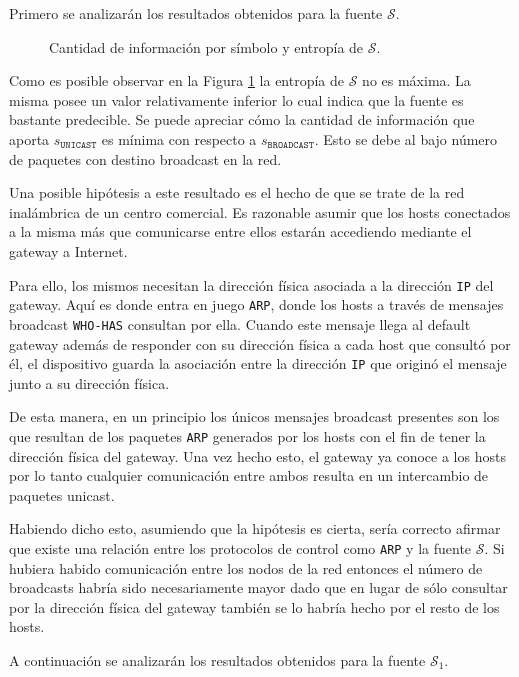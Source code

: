 Primero se analizarán los resultados obtenidos para la fuente $\mathcal{S}$.

\begin{figure}[h]
	\caption{Cantidad de información por símbolo y entropía de $\mathcal{S}$.}
    \label{res:esc2:fig1}
\end{figure}


Como es posible observar en la Figura \ref{res:esc2:fig1} la entropía de
$\mathcal{S}$ no es máxima. La misma posee un valor relativamente inferior lo
cual indica que la fuente es bastante predecible. Se puede apreciar cómo la
cantidad de información que aporta $s_{\texttt{UNICAST}}$ es mínima con respecto
a $s_{\texttt{BROADCAST}}$. Esto se debe al bajo número de paquetes con destino
broadcast en la red.

Una posible hipótesis a este resultado es el hecho de que se trate de la red
inalámbrica de un centro comercial. Es razonable asumir que los hosts conectados
a la misma más que comunicarse entre ellos estarán accediendo mediante el
gateway a Internet.

Para ello, los mismos necesitan la dirección física asociada a la dirección
\texttt{IP} del gateway. Aquí es donde entra en juego \texttt{ARP}, donde los
hosts a través de mensajes broadcast \texttt{WHO-HAS} consultan por ella. Cuando
este mensaje llega al default gateway además de responder con su dirección
física a cada host que consultó por él, el dispositivo guarda la asociación
entre la dirección \texttt{IP} que originó el mensaje junto a su dirección física.

De esta manera, en un principio los únicos mensajes broadcast presentes son los
que resultan de los paquetes \texttt{ARP} generados por los hosts con el fin de
tener la dirección física del gateway. Una vez hecho esto, el gateway ya conoce
a los hosts por lo tanto cualquier comunicación entre ambos resulta en un
intercambio de paquetes unicast.

Habiendo dicho esto, asumiendo que la hipótesis es cierta, sería correcto
afirmar que existe una relación entre los protocolos de control como
\texttt{ARP} y la fuente $\mathcal{S}$. Si hubiera habido comunicación entre los
nodos de la red entonces el número de broadcasts habría sido necesariamente
mayor dado que en lugar de sólo consultar por la dirección física del gateway
también se lo habría hecho por el resto de los hosts.

A continuación se analizarán los resultados obtenidos para la fuente
$\mathcal{S}_1$.

